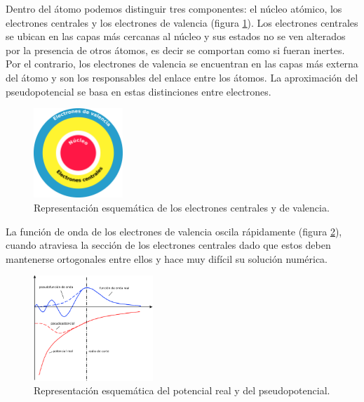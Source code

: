 Dentro del \'atomo podemos distinguir tres componentes: el n\'ucleo at\'omico, los electrones centrales 
y los electrones de valencia (figura \ref{ElectronSeparation}). Los electrones centrales se ubican en las 
capas m\'as cercanas al n\'ucleo  y sus estados  no se ven alterados por la presencia de otros \'atomos, 
es decir se comportan como si fueran inertes. Por el contrario, los electrones de valencia se encuentran 
en las capas m\'as externa del \'atomo y son los responsables del enlace entre los \'atomos. La 
aproximaci\'on del pseudopotencial se basa en estas distinciones entre electrones.

\begin{figure}[H]
    \centering
    \includegraphics[width=0.3\textwidth]{contenido/marco_teorico/pseudopotencial/img_pseudopotencial/electrons_separation.png}
    \caption[Representaci\'on esquem\'atica de los electrones 
    centrales y de 
    valencia]{Representaci\'on esquem\'atica de los electrones 
    centrales y de 
    valencia.}
    \label{ElectronSeparation}
\end{figure}

\noindent La funci\'on de onda de los electrones de valencia oscila 
r\'apidamente (figura 
\ref{pseudopotential}), cuando 
atraviesa la secci\'on de los electrones centrales dado que estos 
deben 
mantenerse ortogonales entre ellos y hace muy dif\'icil su soluci\'on 
num\'erica. 

\begin{figure}[H]
    \centering
    \includegraphics[width=0.4\textwidth]{contenido/marco_teorico/pseudopotencial/img_pseudopotencial/pseudopotential.png}
    \caption[Representaci\'on esquem\'atica del potencial real y del 
    pseudopotencial]{Representaci\'on esquem\'atica del potencial real y del 
    pseudopotencial.}
    \label{pseudopotential}
\end{figure}

